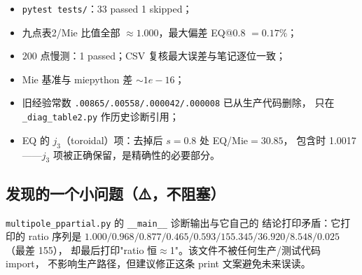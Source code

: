 \begin{itemize}
  \item \texttt{pytest tests/}：33 passed 1 skipped；
  \item 九点表2/Mie 比值全部 $\approx1.000$，最大偏差 EQ@0.8 $=0.17\%$；
  \item 200 点慢测：1 passed；CSV 复核最大误差与笔记逐位一致；
  \item Mie 基准与 miepython 差 $\sim1e{-}16$；
  \item 旧经验常数 \texttt{.00865/.00558/.000042/.000008} 已从生产代码删除，
        只在 \texttt{\_diag\_table2.py} 作历史诊断引用；
  \item EQ 的 $j_3$（toroidal）项：去掉后 $s=0.8$ 处 EQ/Mie$=30.85$，
        包含时 1.0017——$j_3$ 项被正确保留，是精确性的必要部分。
\end{itemize}

\subsection{发现的一个小问题（⚠️，不阻塞）}

\texttt{multipole\_ppartial.py} 的 \texttt{\_\_main\_\_} 诊断输出与它自己的
结论打印矛盾：它打印的 ratio 序列是
$1.000/0.968/0.877/0.465/0.593/155.345/36.920/8.548/0.025$（最差 155），
却最后打印"ratio 恒$\approx$1"。该文件不被任何生产/测试代码 import，
不影响生产路径，但建议修正这条 print 文案避免未来误读。
